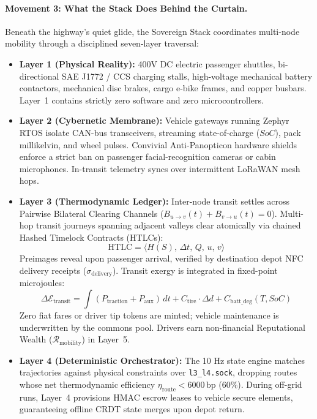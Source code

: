 \paragraph{Movement 3: What the Stack Does Behind the Curtain.}
Beneath the highway's quiet glide, the Sovereign Stack coordinates multi-node mobility through a disciplined seven-layer traversal:
\begin{itemize}
    \item \textbf{Layer 1 (Physical Reality):} 400V DC electric passenger shuttles, bi-directional SAE J1772 / CCS charging stalls, high-voltage mechanical battery contactors, mechanical disc brakes, cargo e-bike frames, and copper busbars. Layer~1 contains strictly zero software and zero microcontrollers.
    \item \textbf{Layer 2 (Cybernetic Membrane):} Vehicle gateways running Zephyr RTOS isolate CAN-bus transceivers, streaming state-of-charge ($SoC$), pack millikelvin, and wheel pulses. Convivial Anti-Panopticon hardware shields enforce a strict ban on passenger facial-recognition cameras or cabin microphones. In-transit telemetry syncs over intermittent LoRaWAN mesh hops.
    \item \textbf{Layer 3 (Thermodynamic Ledger):} Inter-node transit settles across Pairwise Bilateral Clearing Channels ($B_{u \to v}(t) + B_{v \to u}(t) = 0$). Multi-hop transit journeys spanning adjacent valleys clear atomically via chained Hashed Timelock Contracts (HTLCs):
    \[
    \mathrm{HTLC} = \langle H(S), \, \Delta t, \, Q, \, u, \, v \rangle
    \]
    Preimages reveal upon passenger arrival, verified by destination depot NFC delivery receipts ($\sigma_{\mathrm{delivery}}$). Transit exergy is integrated in fixed-point microjoules:
    \[
    \Delta \mathcal{E}_{\mathrm{transit}} = \int (P_{\mathrm{traction}} + P_{\mathrm{aux}}) \, dt + C_{\mathrm{tire}} \cdot \Delta d + C_{\mathrm{batt\_deg}}(T, SoC)
    \]
    Zero fiat fares or driver tip tokens are minted; vehicle maintenance is underwritten by the commons pool. Drivers earn non-financial Reputational Wealth ($\mathcal{R}_{\mathrm{mobility}}$) in Layer~5.
    \item \textbf{Layer 4 (Deterministic Orchestrator):} The 10 Hz state engine matches trajectories against physical constraints over \texttt{l3\_l4.sock}, dropping routes whose net thermodynamic efficiency $\eta_{\mathrm{route}} < 6000\,\mathrm{bp}$ ($60\%$). During off-grid runs, Layer~4 provisions HMAC escrow leases to vehicle secure elements, guaranteeing offline CRDT state merges upon depot return.

\end{itemize}
